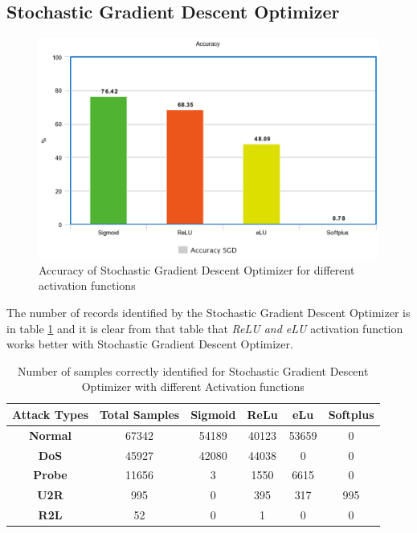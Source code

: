 \documentclass[12pt, a4paper]{report}
\begin{document}
\subsection {Stochastic Gradient Descent Optimizer}
\begin{figure}[ht]
\centering
\captionsetup{justification=centering,margin=2cm}
\includegraphics[width=13cm]{accuracy_SGD_greedy.png}
\caption{ Accuracy of Stochastic Gradient Descent Optimizer for different activation functions}
\label{fig:accuracy_sgd_greedy}
\end{figure}

The number of records identified by the Stochastic Gradient Descent Optimizer is in table \ref{confusion_sgd_greedy} and it is clear from that table that \textit{ReLU and eLU} activation function works better with Stochastic Gradient Descent Optimizer. \\ \par
\clearpage
\begin{table}[ht]
\centering
\captionsetup{justification=centering,margin=2cm}
\begin{tabular}{|c|c|c|c|c|c|}
\hline
\textbf{Attack Types} & \textbf{Total Samples} & \textbf{Sigmoid} & \textbf{ReLu} & \textbf{eLu} & \textbf{Softplus} \\ \hline
\textbf{Normal}       & 67342                  & 54189                     & 40123         & 53659              & 0             \\ \hline
\textbf{DoS}          & 45927                  & 42080          		       & 44038        &0         			& 0             \\ \hline
\textbf{Probe}        & 11656                  & 3           			      & 1550           & 6615        		 & 0              \\ \hline
\textbf{U2R}          & 995                      & 0              				& 395           	 & 317                 & 995               \\ \hline
\textbf{R2L}          & 52                          & 0               		          & 1            	 & 0           		 & 0                \\ \hline
\end{tabular}
\caption{Number of samples correctly identified for Stochastic Gradient Descent Optimizer with different Activation functions}
\label{confusion_sgd_greedy}
\end{table}
\end{document}
